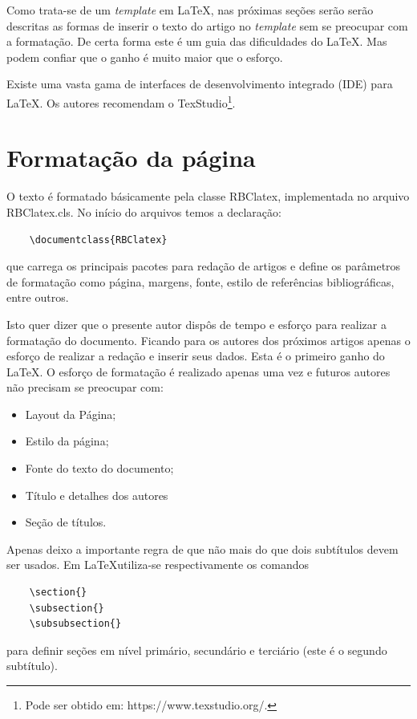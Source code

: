 \documentclass{RBClatex}
\begin{document}
Como trata-se de um \textit{template} em \LaTeX, nas próximas seções serão serão descritas as formas de inserir o texto do artigo no \textit{template} sem se preocupar com a formatação. De certa forma este é um guia das dificuldades do \LaTeX. Mas podem confiar que o ganho é muito maior que o esforço.

Existe uma vasta gama de interfaces de desenvolvimento integrado (IDE) para \LaTeX. Os autores recomendam o TexStudio\footnote{Pode ser obtido em: https://www.texstudio.org/.}.


\section{Formatação da página}

O texto é formatado básicamente pela classe RBClatex, implementada no arquivo RBClatex.cls. No início do arquivos temos a declaração:
\begin{verbatim}
	\documentclass{RBClatex}
\end{verbatim}
que carrega os principais pacotes para redação de artigos e define os parâmetros de formatação como página, margens, fonte, estilo de referências bibliográficas, entre outros.

Isto quer dizer que o presente autor dispôs de tempo e esforço para realizar a formatação do documento. Ficando para os autores dos próximos artigos apenas o esforço de realizar a redação e inserir seus dados. Esta é o primeiro ganho do \LaTeX. O esforço de formatação é realizado apenas uma vez e futuros autores não precisam se preocupar com:
\begin{itemize} [noitemsep,topsep=0pt,leftmargin=*,labelindent=7.5mm,labelsep=2mm]
	\item Layout da Página;
	\item Estilo da página;
	\item Fonte do texto do documento;
	\item Título e detalhes dos autores
	\item Seção de títulos.
\end{itemize}

Apenas deixo a importante regra de que não mais do que dois subtítulos devem ser usados. Em \LaTeX utiliza-se respectivamente os comandos
\begin{verbatim}
	\section{}
	\subsection{}
	\subsubsection{}
\end{verbatim}
para definir seções em nível primário, secundário e terciário (este é o segundo subtítulo).
\end{document}
